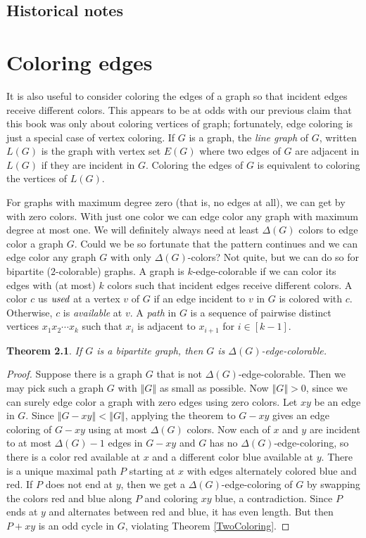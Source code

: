\documentclass{tufte-book} %
\theoremstyle{plain}
\newtheorem{theorem}{Theorem}
\newcommand{\size}[1]{\left\Vert#1\right\Vert}
\newcommand{\irange}[1]{\left[#1\right]}
\begin{document}
\section{Historical notes}


\chapter{Coloring edges}
It is also useful to consider coloring the edges of a graph so that incident edges receive different colors.  This
appears to be at odds with our previous claim that this book was only about coloring vertices of graph; fortunately, edge coloring
is just a special case of vertex coloring.  If $G$ is a graph, the \emph{line graph} of $G$, written
$L(G)$ is the graph with vertex set $E(G)$ where two edges of $G$ are adjacent in $L(G)$ if they are incident in $G$.  Coloring
the edges of $G$ is equivalent to coloring the vertices of $L(G)$.

For graphs with maximum degree zero (that is, no edges at all), we can get by with zero colors.  
With just one color we can edge color any graph with maximum degree at most one.  We will definitely always need at least $\Delta(G)$ colors
to edge color a graph $G$.  Could we be so fortunate that the pattern continues
and we can edge color any graph $G$ with only $\Delta(G)$-colors? Not quite, but we can do so for bipartite ($2$-colorable) graphs.
A graph is $k$-edge-colorable if we can color its edges with (at most) $k$ colors such that incident edges receive different colors.
A color $c$ us $\emph{used}$ at a vertex $v$ of $G$ if an edge incident to $v$ in $G$ is colored with $c$. Otherwise, $c$ is \emph{available} at $v$.
A \emph{path} in $G$ is a sequence of pairwise distinct vertices $x_1x_2\cdots x_k$ such that $x_i$ is adjacent to $x_{i+1}$ for $i \in \irange{k-1}$.

\begin{theorem}\label{DeltaEdgeColoring}
If $G$ is a bipartite graph, then $G$ is $\Delta(G)$-edge-colorable.
\end{theorem}
\begin{proof}
Suppose there is a graph $G$ that is not $\Delta(G)$-edge-colorable.  Then we may pick such a graph $G$ with $\size{G}$ as small as possible.
Now $\size{G} > 0$, since we can surely edge color a graph with zero edges using zero colors.  Let $xy$ be an edge in $G$.  Since $\size{G-xy} < \size{G}$,
applying the theorem to $G-xy$ gives an edge coloring of $G-xy$ using at most $\Delta(G)$ colors.  Now each of $x$ and $y$ are incident to at most $\Delta(G) - 1$ edges
in $G-xy$ and $G$ has no $\Delta(G)$-edge-coloring, so there is a color red available at $x$ and a different color blue available at $y$.  There is a unique maximal 
path $P$ starting at $x$ with edges alternately colored blue and red. If $P$ does not end at $y$, then we get a $\Delta(G)$-edge-coloring of $G$ by swapping the colors red and blue 
along $P$ and coloring $xy$ blue, a contradiction.  Since $P$ ends at $y$ and alternates between red and blue, it has even length.  But then $P + xy$ is an odd cycle in $G$, violating
Theorem \ref{TwoColoring}.
\end{proof}
\end{document}
